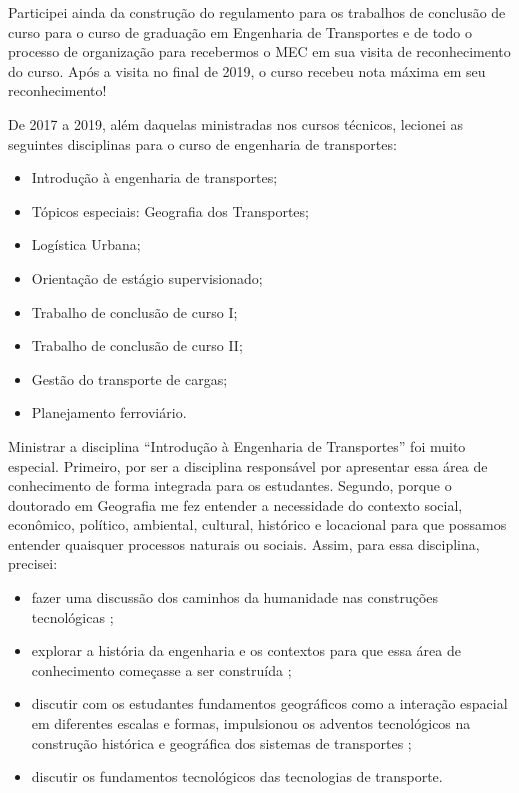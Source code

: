 \documentclass[
]{book}
\begin{document}
Participei ainda da construção do regulamento para os trabalhos de
conclusão de curso para o curso de graduação em Engenharia de
Transportes e de todo o processo de organização para recebermos o MEC em
sua visita de reconhecimento do curso. Após a visita no final de 2019, o
curso recebeu nota máxima em seu reconhecimento!

De 2017 a 2019, além daquelas ministradas nos cursos técnicos, lecionei
as seguintes disciplinas para o curso de engenharia de transportes:

\begin{itemize}
\item
  Introdução à engenharia de transportes;
\item
  Tópicos especiais: Geografia dos Transportes;
\item
  Logística Urbana;
\item
  Orientação de estágio supervisionado;
\item
  Trabalho de conclusão de curso I;
\item
  Trabalho de conclusão de curso II;
\item
  Gestão do transporte de cargas;
\item
  Planejamento ferroviário.
\end{itemize}

Ministrar a disciplina ``Introdução à Engenharia de Transportes'' foi
muito especial. Primeiro, por ser a disciplina responsável por
apresentar essa área de conhecimento de forma integrada para os
estudantes. Segundo, porque o doutorado em Geografia me fez entender a
necessidade do contexto social, econômico, político, ambiental,
cultural, histórico e locacional para que possamos entender quaisquer
processos naturais ou sociais. Assim, para essa disciplina, precisei:

\begin{itemize}
\item
  fazer uma discussão dos caminhos da humanidade nas construções
  tecnológicas \citep{harari2015a, bazzo2013};
\item
  explorar a história da engenharia e os contextos para que essa área
  de conhecimento começasse a ser construída \citep{svinicki2013, ensinod2006, êlmorfilho2019, bazzo2013};
\item
  discutir com os estudantes fundamentos geográficos como a interação
  espacial em diferentes escalas e formas, impulsionou os adventos
  tecnológicos na construção histórica e geográfica dos sistemas de
  transportes \citep{modernt1992, blunden1971, taaffe1973, bavoux2005, thegeog2004, shallat2010};
\item
  discutir os fundamentos tecnológicos das tecnologias de transporte.
\end{itemize}
\end{document}
